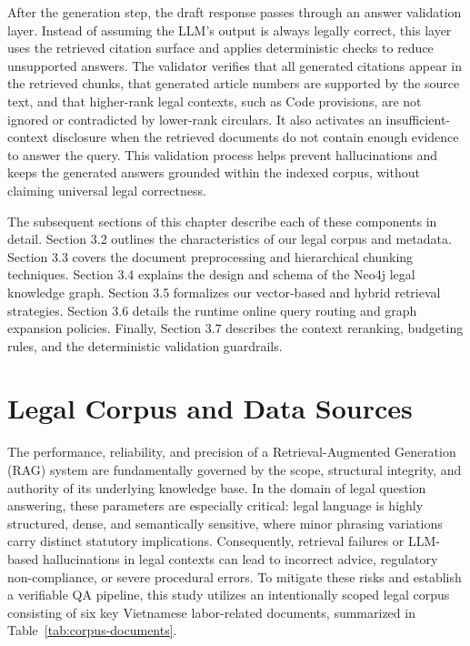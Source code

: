 After the generation step, the draft response passes through an answer validation layer. Instead of assuming the LLM's output is always legally correct, this layer uses the retrieved citation surface and applies deterministic checks to reduce unsupported answers. The validator verifies that all generated citations appear in the retrieved chunks, that generated article numbers are supported by the source text, and that higher-rank legal contexts, such as Code provisions, are not ignored or contradicted by lower-rank circulars. It also activates an insufficient-context disclosure when the retrieved documents do not contain enough evidence to answer the query. This validation process helps prevent hallucinations and keeps the generated answers grounded within the indexed corpus, without claiming universal legal correctness.

The subsequent sections of this chapter describe each of these components in detail. Section 3.2 outlines the characteristics of our legal corpus and metadata. Section 3.3 covers the document preprocessing and hierarchical chunking techniques. Section 3.4 explains the design and schema of the Neo4j legal knowledge graph. Section 3.5 formalizes our vector-based and hybrid retrieval strategies. Section 3.6 details the runtime online query routing and graph expansion policies. Finally, Section 3.7 describes the context reranking, budgeting rules, and the deterministic validation guardrails.

\section{Legal Corpus and Data Sources}

The performance, reliability, and precision of a Retrieval-Augmented Generation (RAG) system are fundamentally governed by the scope, structural integrity, and authority of its underlying knowledge base. In the domain of legal question answering, these parameters are especially critical: legal language is highly structured, dense, and semantically sensitive, where minor phrasing variations carry distinct statutory implications. Consequently, retrieval failures or LLM-based hallucinations in legal contexts can lead to incorrect advice, regulatory non-compliance, or severe procedural errors. To mitigate these risks and establish a verifiable QA pipeline, this study utilizes an intentionally scoped legal corpus consisting of six key Vietnamese labor-related documents, summarized in Table~\ref{tab:corpus-documents}.

